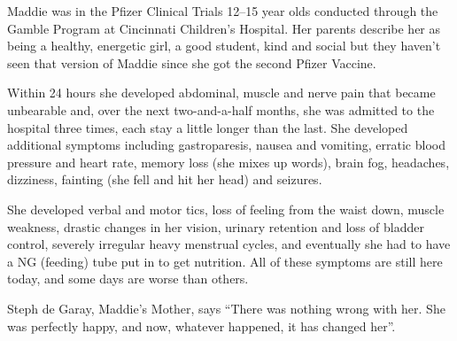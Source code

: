 Maddie was in the Pfizer Clinical Trials 12–15 year olds conducted through the
Gamble Program at Cincinnati Children's Hospital. Her parents describe her as
being a healthy, energetic girl, a good student, kind and social but
they haven't seen that version of Maddie since she got the second Pfizer
Vaccine.

Within 24 hours she developed abdominal, muscle and nerve pain that became
unbearable and, over the next two-and-a-half months, she was admitted to the
hospital three times, each stay a little longer than the last. She developed
additional symptoms including gastroparesis, nausea and vomiting, erratic blood
pressure and heart rate, memory loss (she mixes up words), brain fog, headaches,
dizziness, fainting (she fell and hit her head) and seizures.

She developed verbal and motor tics, loss of feeling from the waist down, muscle
weakness, drastic changes in her vision, urinary retention and loss of bladder
control, severely irregular heavy menstrual cycles, and eventually she had to
have a NG (feeding) tube put in to get nutrition. All of these symptoms are
still here today, and some days are worse than others.

Steph de Garay, Maddie's Mother, says “There was nothing wrong with her. She was
perfectly happy, and now, whatever happened, it has changed her”.

